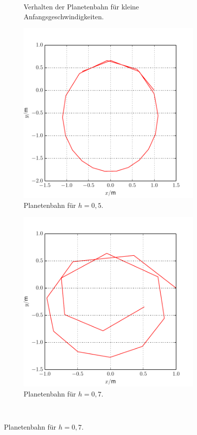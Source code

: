 \begin{figure}[H]
\begin{subfigure}[c]{0.5\textwidth}
		\caption{Verhalten der Planetenbahn für kleine Anfangsgeschwindigkeiten. \label{fig:Bahn3}}
	\end{subfigure}
	\begin{subfigure}[c]{0.5\textwidth}
		\includegraphics[width = \textwidth]{../Plots/Plot_4_A_3.pdf}
		\caption{Planetenbahn für $h=0,5$.}
	\end{subfigure}
	\begin{subfigure}[c]{0.5\textwidth}	
		\includegraphics[width = \textwidth]{../Plots/Plot_4_A_4.pdf}
		\caption{Planetenbahn für $h=0,7$.\label{fig:Bahn2}}
	\end{subfigure}\\
\end{figure}

